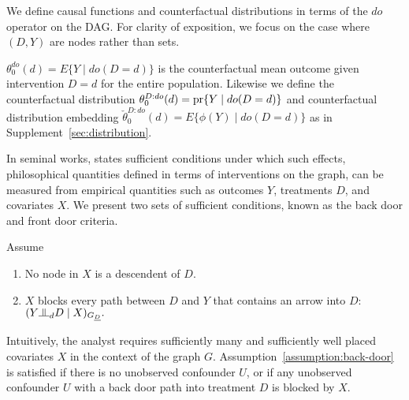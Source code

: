 We define causal functions and counterfactual distributions in terms of the $do$ operator on the DAG. For clarity of exposition, we focus on the case where $(D,Y)$ are nodes rather than sets.
\begin{definition}
$\theta_0^{do}(d)=E\{Y \mid do(D=d)\}$ is the counterfactual mean outcome given intervention $D=d$ for the entire population. Likewise we define the counterfactual distribution $\theta_0^{D:do}(d)=\text{\normalfont pr}\{Y \mid do(D=d)\}$ and counterfactual distribution embedding $
\check{\theta}_0^{D:do}(d)=E\{\phi(Y) \mid do(D=d)\}
$ as in Supplement~\ref{sec:distribution}.
\end{definition}
In seminal works, \cite{pearl1993comment,pearl1995causal} states sufficient conditions under which such effects, philosophical quantities defined in terms of interventions on the graph, can be measured from empirical quantities such as outcomes $Y$, treatments $D$, and covariates $X$. We present two sets of sufficient conditions, known as the back door and front door criteria.

\begin{assumption}\label{assumption:back-door}
Assume
\begin{enumerate}
    \item No node in $X$ is a descendent of $D$.
    \item $X$ blocks every path between $D$ and $Y$ that contains an arrow into $D$:
$
(Y\indep_d D \mid X)_{G_{\underline{D}}}.
$
\end{enumerate}
\end{assumption}
Intuitively, the analyst requires sufficiently many and sufficiently well placed covariates $X$ in the context of the graph $G$. Assumption~\ref{assumption:back-door} is satisfied if there is no unobserved confounder $U$, or if any unobserved confounder $U$ with a back door path into treatment $D$ is blocked by $X$. 

